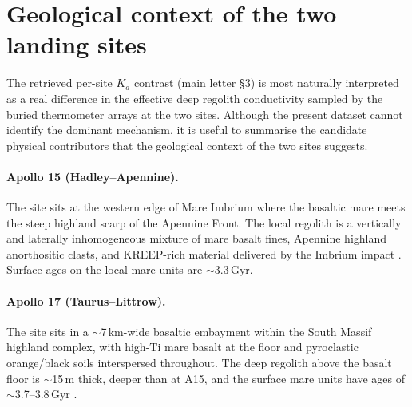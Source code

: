 \documentclass[11pt]{report}
\begin{document}
\section{Geological context of the two landing sites}\label{sec:context}

The retrieved per-site $K_d$ contrast (main letter \S3) is most
naturally interpreted as a real difference in the effective deep
regolith conductivity sampled by the buried thermometer arrays at
the two sites. Although the present dataset cannot identify the
dominant mechanism, it is useful to summarise the candidate
physical contributors that the geological context of the two sites
suggests.

\paragraph{Apollo 15 (Hadley--Apennine).}
The site sits at the western edge of Mare Imbrium where the basaltic
mare meets the steep highland scarp of the Apennine Front. The
local regolith is a vertically and laterally inhomogeneous mixture
of mare basalt fines, Apennine highland anorthositic clasts, and
KREEP-rich material delivered by the Imbrium impact
\citep{korotev2005,wieczorek2006}. Surface ages on the local
mare units are $\sim$3.3\,Gyr.

\paragraph{Apollo 17 (Taurus--Littrow).}
The site sits in a $\sim$7\,km-wide basaltic embayment within the
South Massif highland complex, with high-Ti mare basalt at the
floor and pyroclastic orange/black soils interspersed throughout.
The deep regolith above the basalt floor is $\sim$15\,m thick,
deeper than at A15, and the surface mare units have ages of
$\sim$3.7--3.8\,Gyr \citep{wieczorek2006,crawford2015}.
\end{document}
